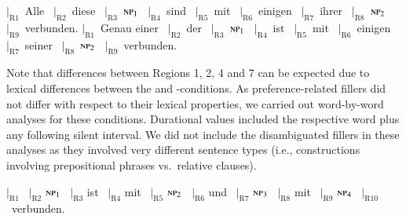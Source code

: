 \documentclass[fleqn,reqno,10pt,draft]{article}
\newcommand{\as}{\acro{as}}
\renewcommand{\es}{\acro{es}}
\begin{document}
\begin{exe}
  \ex
    \begin{xlist}
      \ex $|_{\text{R}1}$~Alle  	\ $|_{\text{R}2}$~diese 
      \ $|_{\text{R}3}$~$\textsc{np}_1$  
      \ $|_{\text{R}4}$~sind  \ $|_{\text{R}5}$~mit  \
      $|_{\text{R}6}$~einigen  \ $|_{\text{R}7}$~ihrer 
       \ $|_{\text{R}8}$~{$\textsc{np}_2$}  \ $|_{\text{R}9}$~verbunden.
    \ex       $|_{\text{R}1}$~Genau einer  	\ $|_{\text{R}2}$~der 
      \ $|_{\text{R}3}$~$\textsc{np}_1$  
      \ $|_{\text{R}4}$~ist  \ $|_{\text{R}5}$~mit  \
      $|_{\text{R}6}$~einigen  \ $|_{\text{R}7}$~seiner 
       \ $|_{\text{R}8}$~{$\textsc{np}_2$}  \ $|_{\text{R}9}$~verbunden.
    \end{xlist}
\end{exe}

\noindent Note that differences between Regions 1, 2, 4 and 7 can be expected
due to lexical differences between the \as and \es-conditions. As
preference-related fillers did not differ with respect to their lexical
properties, we carried out word-by-word analyses for these
conditions. Durational values included the respective word plus any
following silent interval. We did not include the
disambiguated fillers in these analyses as they involved very
different sentence types (i.e., constructions involving prepositional
phrases vs.~relative clauses).

\begin{exe}
  \ex $|_{\text{R}1}$   	\ $|_{\text{R}2}$ $\textsc{np}_1$
      \ $|_{\text{R}3}$ ist 
      \ $|_{\text{R}4}$ mit  \ $|_{\text{R}5}$ $\textsc{np}_2$   \
      $|_{\text{R}6}$ und  \ $|_{\text{R}7}$ $\textsc{np}_3$ 
       \ $|_{\text{R}8}$  mit  \ $|_{\text{R}9}$ $\textsc{np}_4$ \ $|_{\text{R}10}$~verbunden.
\end{exe}
\end{document}
